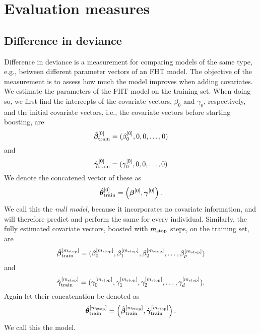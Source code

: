 \chapter{Evaluation measures}

\section{Difference in deviance}
Difference in deviance is a measurement for comparing models of the same type, e.g., between different parameter vectors of an FHT model.
The objective of the measurement is to assess how much the model improves when adding covariates.
We estimate the parameters of the FHT model on the training set.
When doing so, we first find the intercepts of the covariate vectors, $\beta_0$ and $\gamma_0$, respectively,
and the initial covariate vectors, i.e., the covariate vectors before starting boosting, are
\begin{equation*}
    \hat{\boldsymbol{\beta}}^{[0]}_{\text{train}}=(\beta_0^{[0]},0,0,\ldots,0)
\end{equation*}
and
\begin{equation*}
    \hat{\boldsymbol{\gamma}}^{[0]}_{\text{train}}=(\gamma_0^{[0]},0,0,\ldots,0)
\end{equation*}
We denote the concatened vector of these as
\begin{equation*}
    \hat{\boldsymbol{\theta}}^{[0]}_{\text{train}}=\left(\boldsymbol{\beta}^{[0]},\boldsymbol{\gamma}^{[0]}\right).
\end{equation*}
We call this the \textit{null model}, because it incorporates no covariate information, and will therefore predict and perform the same for every individual.
Similarly, the fully estimated covariate vectors, boosted with $m_{\text{stop}}$ steps, on the training set, are
\begin{equation*}
    \hat{\boldsymbol{\beta}}^{[m_{\text{stop}}]}_{\text{train}}=(\beta_0^{[m_{\text{stop}}]},\beta_1^{[m_{\text{stop}}]},\beta_2^{[m_{\text{stop}}]},\ldots,\beta_p^{[m_{\text{stop}}]})
\end{equation*}
and
\begin{equation*}
    \hat{\boldsymbol{\gamma}}^{[m_{\text{stop}}]}_{\text{train}}=(\gamma_0^{[m_{\text{stop}}]},\gamma_1^{[m_{\text{stop}}]},\gamma_2^{[m_{\text{stop}}]},\ldots,\gamma_d^{[m_{\text{stop}}]}).
\end{equation*}
Again let their concatenation be denoted as
\begin{equation*}
    \hat{\boldsymbol{\theta}}^{[m_{\text{stop}}]}_{\text{train}}=\left(\hat{\boldsymbol{\beta}}^{[m_{\text{stop}}]}_{\text{train}},\hat{\boldsymbol{\gamma}}^{[m_{\text{stop}}]}_{\text{train}}\right).
\end{equation*}
We call this the model.
